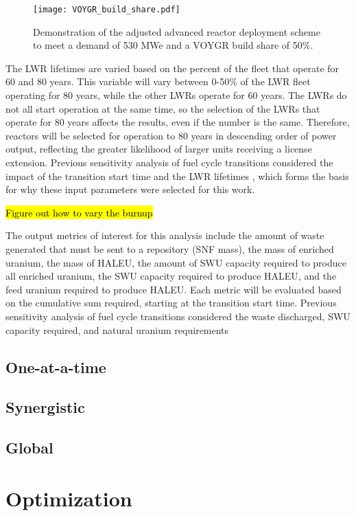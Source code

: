 \begin{figure}
    \centering 
    \texttt{[image: VOYGR\_build\_share.pdf]}
    \caption{Demonstration of the adjusted advanced reactor deployment 
    scheme to meet a demand of 530 MWe and a VOYGR build share of 
    50\%.}
    \label{fig:build-share-deploy}
\end{figure}

The \gls{LWR} lifetimes are varied based 
on the percent of the fleet that operate for 60 and 80 years. This 
variable will vary between 0-50\% of the \gls{LWR} fleet operating for 80 
years, while the other \glspl{LWR} operate for 60 years. The 
\glspl{LWR} do not all start operation at the same time, so the 
selection of the \glspl{LWR} that operate for 80 years affects the results, 
even if the number is the same. Therefore, reactors will be selected for 
operation to 80 years in 
descending order of power output, reflecting the greater likelihood of 
larger units receiving a license extension. Previous sensitivity analysis of 
fuel cycle transitions considered the impact of the transition start time 
and the \gls{LWR} lifetimes \cite{chee_sensitivity_2019,feng_sensitivity_2020},
which forms the basis for why these input parameters were selected for this 
work.

\hl{Figure out how to vary the burnup}

The output metrics of 
interest for this analysis include the amount of waste generated that 
must be sent to a repository (\gls{SNF} mass), the mass of enriched uranium, 
the mass of \gls{HALEU},
the amount of \gls{SWU} capacity required to produce all enriched uranium, the 
\gls{SWU} capacity required to produce \gls{HALEU}, and the feed uranium 
required to produce \gls{HALEU}. Each metric will be evaluated based on the 
cumulative sum required, starting at the transition start time. Previous 
sensitivity analysis of fuel cycle transitions considered the waste 
discharged, \gls{SWU} 
capacity required, and natural uranium requirements
\cite{richards_application_2021,feng_sensitivity_2020} 


\subsection{One-at-a-time}

\subsection{Synergistic}

\subsection{Global}

\section{Optimization}
